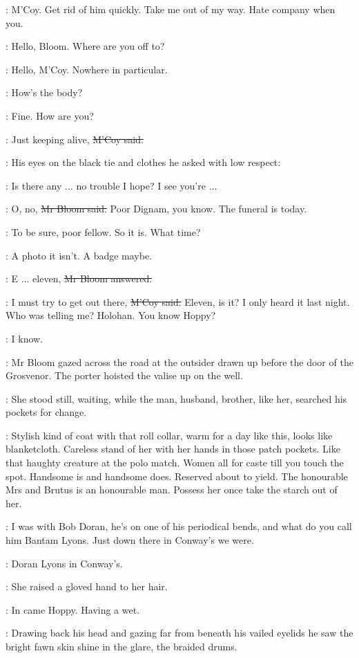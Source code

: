 \BloomInt:
M'Coy.
Get rid of him quickly.
Take me out of my way.
Hate company when you.

\mccoy:
Hello, Bloom.
Where are you off to?

\Bloom:
Hello, M'Coy.
Nowhere in particular.

\mccoy:
How's the body?

\Bloom:
Fine.
How are you?

\mccoy:
Just keeping alive,
\sout{M'Coy said.}

:
His eyes on the black tie and clothes
he asked with low respect:

\mccoy:
Is there any ... no trouble I hope?
I see you're ...

\Bloom:
O, no, \sout{Mr Bloom said.}
Poor Dignam, you know.
The funeral is today.

\mccoy:
To be sure, poor fellow.
So it is.
What time?

\BloomInt:
A photo it isn't.
A badge maybe.

\Bloom:
E ... eleven,
\sout{Mr Bloom answered.}

\mccoy:
I must try to get out there,
\sout{M'Coy said.}
Eleven, is it?
I only heard it last night.
Who was telling me?
Holohan.
You know Hoppy?

\Bloom:
I know.

:
Mr Bloom gazed across the road at the outsider
drawn up before the door of the Grosvenor.
The porter hoisted the valise up on the well.

:
She stood still, waiting,
while the man, husband, brother,
like her,
searched his pockets for change.

\BloomInt:
Stylish kind of coat with that roll collar,
warm for a day like this,
looks like blanketcloth.
Careless stand of her
with her hands in those patch pockets.
Like that haughty creature at the polo match.
Women all for caste till you touch the spot.
Handsome is and handsome does.
Reserved about to yield.
The honourable Mrs
and Brutus is an honourable man.
Possess her once
take the starch out of her.

\mccoy:
I was with Bob Doran,
he's on one of his periodical bends,
and what do you call him Bantam Lyons.
Just down there in Conway's
we were.

\mccoy:
Doran Lyons in Conway's.

:
She raised a gloved hand to her hair.

\mccoy:
In came Hoppy.
Having a wet.

:
Drawing back his head
and gazing far from beneath
his vailed eyelids
he saw the bright fawn skin shine in the glare,
the braided drums.


